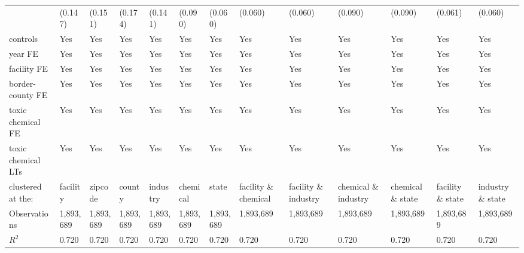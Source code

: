 \begin{table}[H]
{\begin{tabular}{@{}lllllllllllll@{}}
            & (0.147)   & (0.151)   & (0.174)   & (0.141)   & (0.090)   & (0.060)   & (0.060)              & (0.060)              & (0.090)              & (0.090)          & (0.061)          & (0.060)          \\
            controls                       & Yes       & Yes       & Yes       & Yes       & Yes       & Yes       & Yes                  & Yes                  & Yes                  & Yes               & Yes               & Yes               \\
            year FE                        & Yes       & Yes       & Yes       & Yes       & Yes       & Yes       & Yes                  & Yes                  & Yes                  & Yes               & Yes               & Yes               \\
            facility FE                    & Yes       & Yes       & Yes       & Yes       & Yes       & Yes       & Yes                  & Yes                  & Yes                  & Yes               & Yes               & Yes               \\
            border-county FE               & Yes       & Yes       & Yes       & Yes       & Yes       & Yes       & Yes                  & Yes                  & Yes                  & Yes               & Yes               & Yes               \\
            toxic chemical FE              & Yes       & Yes       & Yes       & Yes       & Yes       & Yes       & Yes                  & Yes                  & Yes                  & Yes               & Yes               & Yes               \\
            toxic chemical LTs             & Yes       & Yes       & Yes       & Yes       & Yes       & Yes       & Yes                  & Yes                  & Yes                  & Yes               & Yes               & Yes               \\ \midrule
            clustered at the:              & facility  & zipcode   & county    & industry  & chemical  & state     & facility \& chemical & facility \& industry & chemical \& industry & chemical \& state & facility \& state & industry \& state \\
            Observations                   & 1,893,689 & 1,893,689 & 1,893,689 & 1,893,689 & 1,893,689 & 1,893,689 & 1,893,689            & 1,893,689            & 1,893,689            & 1,893,689         & 1,893,689         & 1,893,689         \\
            $R^2$                          & 0.720     & 0.720     & 0.720     & 0.720     & 0.720     & 0.720     & 0.720                & 0.720                & 0.720                & 0.720             & 0.720             & 0.720             \\ \bottomrule \bottomrule

\end{tabular}}
\end{table}
